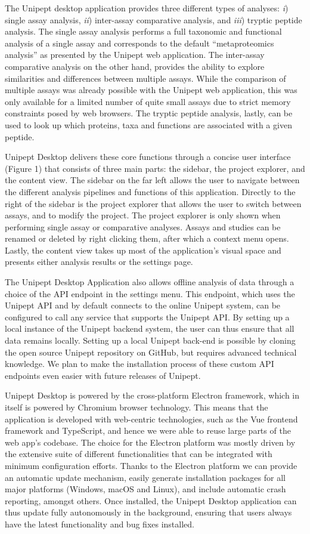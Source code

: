 The Unipept desktop application provides three different types of
analyses: \emph{i}) single assay analysis, \emph{ii}) inter-assay
comparative analysis, and \emph{iii}) tryptic peptide analysis. The
single assay analysis performs a full taxonomic and functional analysis
of a single assay and corresponds to the default ``metaproteomics
analysis'' as presented by the Unipept web application. The inter-assay
comparative analysis on the other hand, provides the ability to explore
similarities and differences between multiple assays. While the
comparison of multiple assays was already possible with the Unipept web
application, this was only available for a limited number of quite small
assays due to strict memory constraints posed by web browsers. The
tryptic peptide analysis, lastly, can be used to look up which proteins,
taxa and functions are associated with a given peptide.

Unipept Desktop delivers these core functions through a concise user
interface (Figure 1) that consists of three main parts: the sidebar, the
project explorer, and the content view. The sidebar on the far left
allows the user to navigate between the different analysis pipelines and
functions of this application. Directly to the right of the sidebar is
the project explorer that allows the user to switch between assays, and
to modify the project. The project explorer is only shown when
performing single assay or comparative analyses. Assays and studies can
be renamed or deleted by right clicking them, after which a context menu
opens. Lastly, the content view takes up most of the application's
visual space and presents either analysis results or the settings page.

The Unipept Desktop Application also allows offline analysis of data
through a choice of the API endpoint in the settings menu. This
endpoint, which uses the Unipept API and by default connects to the
online Unipept system, can be configured to call any service that
supports the Unipept API. By setting up a local instance of the Unipept
backend system, the user can thus ensure that all data remains locally.
Setting up a local Unipept back-end is possible by cloning the open
source Unipept repository on GitHub, but requires advanced technical
knowledge. We plan to make the installation process of these custom API
endpoints even easier with future releases of Unipept.

Unipept Desktop is powered by the cross-platform Electron framework,
which in itself is powered by Chromium browser technology. This means
that the application is developed with web-centric technologies, such as
the Vue frontend framework and TypeScript, and hence we were able to
reuse large parts of the web app's codebase. The choice for the Electron
platform was mostly driven by the extensive suite of different
functionalities that can be integrated with minimum configuration
efforts. Thanks to the Electron platform we can provide an automatic
update mechanism, easily generate installation packages for all major
platforms (Windows, macOS and Linux), and include automatic crash
reporting, amongst others. Once installed, the Unipept Desktop
application can thus update fully autonomously in the background,
ensuring that users always have the latest functionality and bug fixes
installed.

